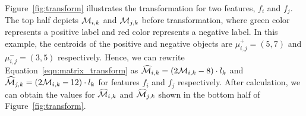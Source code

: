 \begin{example}[Transformation]
Figure~\ref{fig:transform} illustrates the transformation for two features, $f_i$ and $f_j$. The top half depicts ${\mathcal{M}}_{i,k}$ and ${\mathcal{M}}_{j,k}$ before transformation, where green color represents a positive label and red color represents a negative label. In this example, the centroids of the positive and negative objects are $\mu_{i,j}^+=(5,7)$ and $\mu_{i,j}^-=(3,5)$ respectively. Hence, we can rewrite Equation~\ref{eqn:matrix_transform} as $\widehat{{\mathcal{M}}}_{i,k} = (2{\mathcal{M}}_{i,k}-8)\cdot l_k$ and $\widehat{{\mathcal{M}}}_{j,k} = (2{\mathcal{M}}_{i,k}-12)\cdot l_k$ for features $f_i$ and $f_j$ respectively. After calculation, we can obtain the values for $\widehat{{\mathcal{M}}}_{i,k}$ and $\widehat{{\mathcal{M}}}_{j,k}$ shown in the bottom half of Figure~\ref{fig:transform}.
\end{example}



